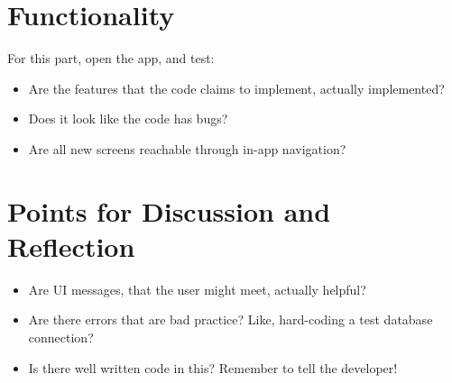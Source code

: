 \section{Functionality}
For this part, open the app, and test:

\begin{itemize}
\item Are the features that the code claims to implement, actually
 implemented?
\item Does it look like the code has bugs?
\item Are all new screens reachable through in-app navigation?
\end{itemize}

\section{Points for Discussion and Reflection}
\begin{itemize}
\item Are UI messages, that the user might meet, actually helpful?
\item Are there errors that are bad practice? Like, hard-coding a
 test database connection?
\item Is there well written code in this? Remember to tell the
 developer!
\end{itemize}